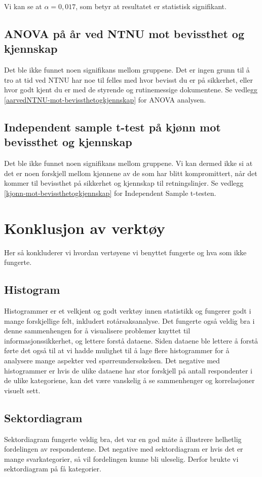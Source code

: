 Vi kan se at \(\alpha = 0,017\), som betyr at resultatet er statistisk signifikant. 


\subsection{ANOVA på år ved NTNU mot bevissthet og kjennskap}
Det ble ikke funnet noen signifikans mellom gruppene. Det er ingen grunn til å tro at tid ved NTNU har noe til felles med hvor bevisst du er på sikkerhet, eller hvor godt kjent du er med de styrende og rutinemessige dokumentene. Se vedlegg \ref{aarvedNTNU-mot-bevissthetogkjennskap} for ANOVA analysen.


\subsection{Independent sample t-test på kjønn mot bevissthet og kjennskap}
Det ble ikke funnet noen signifikans mellom gruppene. Vi kan dermed ikke si at det er noen forskjell mellom kjønnene av de som har blitt kompromittert, når det kommer til bevissthet på sikkerhet og kjennskap til retningslinjer. Se vedlegg \ref{kjonn-mot-bevissthetogkjennskap} for Independent Sample t-testen. 



\section{Konklusjon av verktøy}
Her så konkluderer vi hvordan vertøyene vi benyttet fungerte og hva som ikke fungerte. 
\subsection{Histogram}
Histogrammer er et velkjent og godt verktøy innen statistikk og fungerer godt i mange forskjellige felt, inkludert rotårsaksanalyse.  Det fungerte også veldig bra i denne sammenhengen for å visualisere problemer knyttet til informasjonssikkerhet, og lettere forstå dataene. Siden dataene ble lettere å forstå førte det også til at vi hadde mulighet til å lage flere histogrammer for å analysere mange aspekter ved spørreundersøkelsen. Det negative med histogrammer er hvis de ulike dataene har stor forskjell på antall respondenter i de ulike kategoriene, kan det være vanskelig å se sammenhenger og korrelasjoner visuelt sett. 

\subsection{Sektordiagram}
Sektordiagram fungerte veldig bra, det var en god måte å illustrere helhetlig fordelingen av respondentene. Det negative med sektordiagram er hvis det er mange svarkategorier, så vil fordelingen kunne bli uleselig. Derfor brukte vi sektordiagram på få kategorier. 

